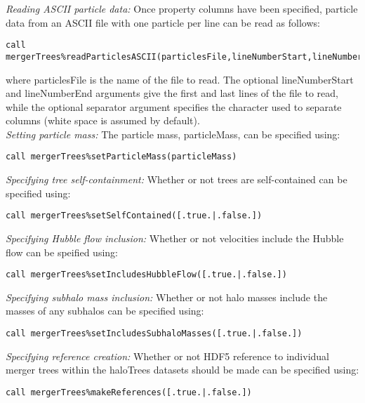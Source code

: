 \noindent \emph{Reading ASCII particle data:} Once property columns have been specified, particle data from an ASCII file with one particle per line can be read as follows:
\begin{verbatim}
call mergerTrees%readParticlesASCII(particlesFile,lineNumberStart,lineNumberStop,separator=",")
\end{verbatim}
where {\normalfont \ttfamily particlesFile} is the name of the file to read. The optional {\normalfont \ttfamily lineNumberStart} and {\normalfont \ttfamily lineNumberEnd} arguments give the first and last lines of the file to read, while the optional {\normalfont \ttfamily separator} argument specifies the character used to separate columns (white space is assumed by default).\\

\noindent \emph{Setting particle mass:} The particle mass, {\normalfont \ttfamily particleMass}, can be specified using:
\begin{verbatim}
call mergerTrees%setParticleMass(particleMass)
\end{verbatim}

\noindent \emph{Specifying tree self-containment:} Whether or not trees are self-contained can be specified using:
\begin{verbatim}
call mergerTrees%setSelfContained([.true.|.false.])
\end{verbatim}

\noindent \emph{Specifying Hubble flow inclusion:} Whether or not velocities include the Hubble flow can be speified using:
\begin{verbatim}
call mergerTrees%setIncludesHubbleFlow([.true.|.false.])
\end{verbatim}

\noindent \emph{Specifying subhalo mass inclusion:} Whether or not halo masses include the masses of any subhalos can be specified using:
\begin{verbatim}
call mergerTrees%setIncludesSubhaloMasses([.true.|.false.])
\end{verbatim}

\noindent \emph{Specifying reference creation:} Whether or not HDF5 reference to individual merger trees within the {\normalfont \ttfamily haloTrees} datasets should be made can be specified using:
\begin{verbatim}
call mergerTrees%makeReferences([.true.|.false.])
\end{verbatim}

